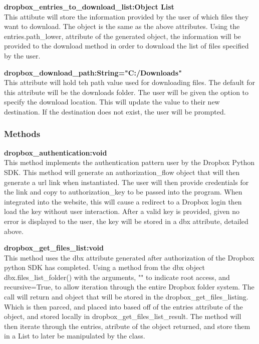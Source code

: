 \textbf{dropbox\_entries\_to\_download\_list:Object List} \\
    This attibute will store the information provided by the user of which files they want to download. The object is the same as the above 
    attributes. Using the entries.path\_lower, attribute of the generated object, the information will be provided to the download method in 
    order to download the list of files specified by the user.

\textbf{dropbox\_download\_path:String="C:/Downloads"} \\
    This attribute will hold teh path value used for downloading files. The default for this attribute will be the downloads folder. The user 
    will be given the option to specify the download location. This will update the value to their new destination. If the destination does 
    not exist, the user will be prompted.

\subsubsection{Methods}
\textbf{dropbox\_authentication:void} \\
    This method implements the authentication pattern user by the Dropbox Python SDK. This method will generate an authorization\_flow object
    that will then generate a url link when instantiated. The user will then provide credentials for the link and copy to authorization\_key 
    to be passed into the program. When integrated into the website, this will cause a redirect to a Dropbox login then load the key without 
    user interaction. After a valid key is provided, given no error is displayed to the user, the key will be stored in a dbx attribute, detailed 
    above.  

\textbf{dropbox\_get\_files\_list:void} \\
    This method uses the dbx attribute generated after authorization of the Dropbox python SDK has completed. Using a method from the dbx object
    dbx.files\_list\_folder() with the arguments, "" to indicate root access, and recursive=True, to allow iteration through the entire Dropbox
    folder system. The call will return and object that will be stored in the dropbox\_get\_files\_listing. Which is then parced, and placed into
    based off of the entries attribute of the object, and stored locally in dropbox\_get\_files\_list\_result. The method will then iterate through
    the entries, atribute of the object returned, and store them in a List to later be manipulated by the class.

